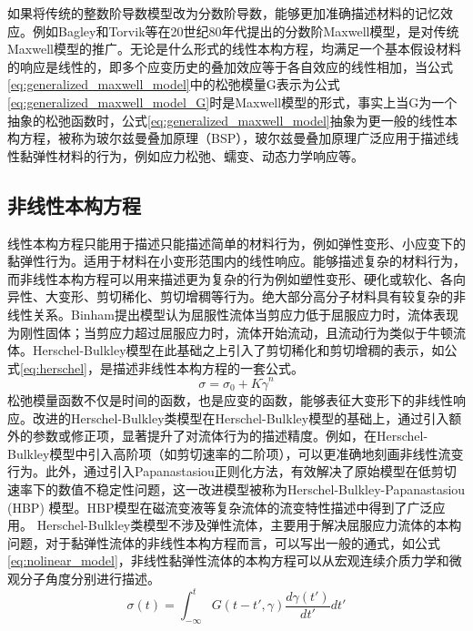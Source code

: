 如果将传统的整数阶导数模型改为分数阶导数，能够更加准确描述材料的记忆效应。例如Bagley和Torvik等在20世纪80年代提出的分数阶Maxwell模型，是对传统Maxwell模型的推广\cite{bagley1986fractional}。无论是什么形式的线性本构方程，均满足一个基本假设材料的响应是线性的，即多个应变历史的叠加效应等于各自效应的线性相加，当公式\eqref{eq:generalized_maxwell_model}中的松弛模量G表示为公式\eqref{eq:generalized_maxwell_model_G}时是Maxwell模型的形式，事实上当G为一个抽象的松弛函数时，公式\eqref{eq:generalized_maxwell_model}抽象为更一般的线性本构方程，被称为玻尔兹曼叠加原理（BSP），玻尔兹曼叠加原理广泛应用于描述线性黏弹性材料的行为，例如应力松弛、蠕变、动态力学响应等\cite{boltzmannZurTheorieElastischen1878}。
\subsection{非线性本构方程}
线性本构方程只能用于描述只能描述简单的材料行为，例如弹性变形、小应变下的黏弹性行为\cite{fedorowiczElasticPerfectlyPlastic2024,lingComparisonReviewClassical2023,ricarteTutorialReviewLinear2024}。适用于材料在小变形范围内的线性响应。能够描述复杂的材料行为，而非线性本构方程可以用来描述更为复杂的行为例如塑性变形、硬化或软化、各向异性、大变形、剪切稀化、剪切增稠等行为。绝大部分高分子材料具有较复杂的非线性关系。Binham提出模型认为屈服性流体当剪应力低于屈服应力时，流体表现为刚性固体；当剪应力超过屈服应力时，流体开始流动，且流动行为类似于牛顿流体\cite{binghaminvestigation}。Herschel-Bulkley模型在此基础之上引入了剪切稀化和剪切增稠的表示，如公式\eqref{eq:herschel}，是描述非线性本构方程的一套公式\cite{herschel1926konsistenzmessungen}。
\begin{equation}
	\sigma=\sigma_0+K\dot{\gamma}^n \label{eq:herschel}
\end{equation}
松弛模量函数不仅是时间的函数，也是应变的函数，能够表征大变形下的非线性响应。改进的Herschel-Bulkley类模型在Herschel-Bulkley模型的基础上，通过引入额外的参数或修正项，显著提升了对流体行为的描述精度。例如，在Herschel-Bulkley模型中引入高阶项（如剪切速率的二阶项），可以更准确地刻画非线性流变行为\cite{magnon2021precise}。此外，通过引入Papanastasiou正则化方法，有效解决了原始模型在低剪切速率下的数值不稳定性问题，这一改进模型被称为Herschel-Bulkley-Papanastasiou (HBP) 模型。HBP模型在磁流变液等复杂流体的流变特性描述中得到了广泛应用\cite{papanastasiou1987flows}。
Herschel-Bulkley类模型不涉及弹性流体，主要用于解决屈服应力流体的本构问题，对于黏弹性流体的非线性本构方程而言，可以写出一般的通式，如公式\eqref{eq:nolinear_model}，非线性黏弹性流体的本构方程可以从宏观连续介质力学和微观分子角度分别进行描述\cite{ewoldtDesigningComplexFluids2022}。
\begin{equation}
	\sigma(t) = \int_{-\infty}^{t} G(t-t',\gamma) \frac{d\gamma(t')}{dt'} dt' \label{eq:nolinear_model}
\end{equation}

